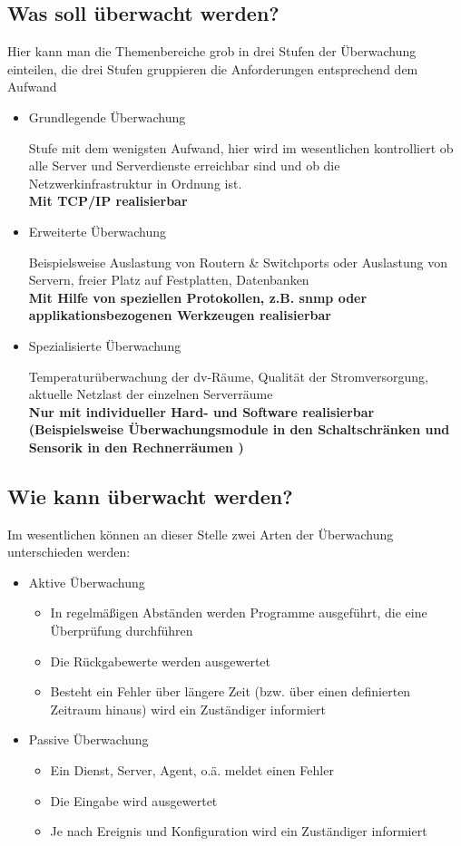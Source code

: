 \documentclass[12pt,a4paper,parskip,listof=totoc,bibliography=totoc]{scrreprt}
\begin{document}
	\subsection{Was soll überwacht werden?}
	Hier kann man die Themenbereiche grob in drei Stufen der Überwachung einteilen, die drei Stufen gruppieren die Anforderungen entsprechend dem Aufwand
	\begin{itemize}
		\item Grundlegende Überwachung
		
		Stufe mit dem wenigsten Aufwand, hier wird im wesentlichen kontrolliert ob alle Server und Serverdienste erreichbar sind und ob die Netzwerkinfrastruktur in Ordnung ist.\\
		\textbf{Mit TCP/IP realisierbar}
		\item Erweiterte Überwachung
		
		Beispielsweise Auslastung von Routern \& Switchports oder Auslastung von Servern, freier Platz auf Festplatten, Datenbanken\\
		\textbf{Mit Hilfe von speziellen Protokollen, z.B. \acrshort{snmp} oder applikationsbezogenen Werkzeugen realisierbar}
		\item Spezialisierte Überwachung
		
		Temperaturüberwachung der \acrshort{dv}-Räume, Qualität der Stromversorgung, aktuelle Netzlast der einzelnen Serverräume\\
		\textbf{Nur mit individueller Hard- und Software realisierbar (Beispielsweise Überwachungsmodule in den Schaltschränken und Sensorik in den Rechnerräumen )}
	\end{itemize}
	\subsection{Wie kann überwacht werden?}
	Im wesentlichen können an dieser Stelle zwei Arten der Überwachung unterschieden werden:
	\begin{itemize}
		\item Aktive Überwachung
		\begin{itemize}
		\item In regelmäßigen Abständen werden Programme ausgeführt, die eine Überprüfung durchführen
		\item Die Rückgabewerte werden ausgewertet
		\item Besteht ein Fehler über längere Zeit (bzw. über einen definierten Zeitraum hinaus) wird ein Zuständiger informiert
		\end{itemize}
		\item Passive Überwachung
		\begin{itemize}
			\item Ein Dienst, Server, Agent, o.ä. meldet einen Fehler
			\item Die Eingabe wird ausgewertet
			\item Je nach Ereignis und Konfiguration wird ein Zuständiger informiert
		\end{itemize}
	\end{itemize}
\end{document}
